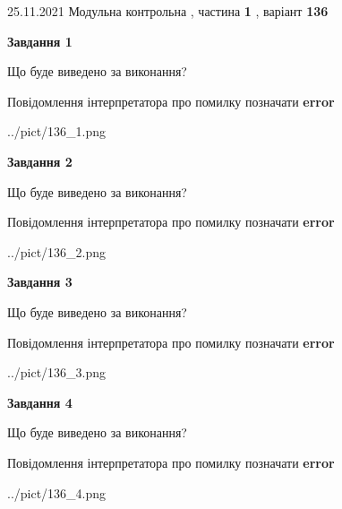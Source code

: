 \documentclass[10pt, ukrainian]{article}
\begin{document}
{25.11.2021 Модульна контрольна , частина \textbf { 1 }, варіант  \No \textbf { 136 }\par}
{
\begin {large}

{\begin {center}\textbf{Завдання 1}\end {center}}\par
Що буде виведено за виконання? \par
Повідомлення інтерпретатора про помилку позначати \textbf{error}

\begin{center}
	{../pict/136_1.png}
\end{center}
\newpage

{\begin {center}\textbf{Завдання 2}\end {center}}\par
Що буде виведено за виконання? \par
Повідомлення інтерпретатора про помилку позначати \textbf{error}

\begin{center}
	{../pict/136_2.png}
\end{center}
\newpage

{\begin {center}\textbf{Завдання 3}\end {center}}\par
Що буде виведено за виконання? \par
Повідомлення інтерпретатора про помилку позначати \textbf{error}

\begin{center}
	{../pict/136_3.png}
\end{center}
\newpage

{\begin {center}\textbf{Завдання 4}\end {center}}\par
Що буде виведено за виконання? \par
Повідомлення інтерпретатора про помилку позначати \textbf{error}

\begin{center}
	{../pict/136_4.png}
\end{center}
\newpage


\end{large}}
\end{document}
